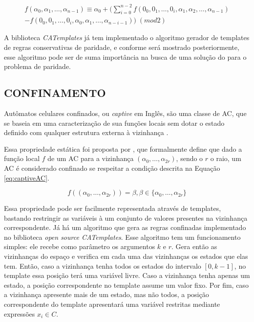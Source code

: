 \documentclass[12pt,a4paper]{article}
\begin{document}
	\begin{equation}
	\begin{split}
	f(\alpha_0,\alpha_1, \dots,\alpha_{n-1}) \equiv \alpha_0 + (\sum_{i=0}^{n-2}f(0_0,0_1, \dots,0_i,\alpha_1,\alpha_2, \dots,\alpha_{n-1}) \\- f(0_0,0_1, \dots,0_i,\alpha_0,\alpha_1, \dots,\alpha_{n-i-1})) \; (mod 2)  
	\label{eq:parityConservativeCA}
	\end{split}
	\end{equation}

	A biblioteca \textit{CATemplates} já tem implementado o algoritmo gerador de templates de regras conservativas de paridade, e conforme será mostrado posteriormente, esse algoritmo pode ser de suma importância na busca de uma solução do para o problema de paridade.





	\subsection{CONFINAMENTO}
	Autômatos celulares confinados, ou \textit{captive} em Inglês, são uma classe de AC, que se baseia em uma caracterização de sua funções locais sem dotar o estado definido com qualquer estrutura externa à vizinhança \cite{theyssier2004captive}. 

	Essa propriedade estática foi proposta por , que formalmente define que dado a função local $f$ de um AC para a vizinhança $(\alpha_0, \dots, \alpha_{2r})$, sendo o $r$ o raio, um AC é considerado confinado se respeitar a condição descrita na Equação \ref{eq:captiveAC}.

	\begin{equation}
	f((\alpha_0, \dots, \alpha_{2r})) = \beta, \beta \in \{\alpha_0, \dots, \alpha_{2r}\}
	\label{eq:captiveAC}
	\end{equation}

	Essa propriedade pode ser facilmente representada através de templates, bastando restringir as variáveis à um conjunto de valores presentes na vizinhança correspondente. Já há um algoritmo que gera as regras confinadas implementado no biblioteca \textit{open source CATemplates}. Esse algoritmo tem um funcionamento simples: ele recebe como parâmetro os argumentos $k$ e $r$. Gera então as vizinhanças do espaço e verifica em cada uma das vizinhanças os estados que elas tem. Então, caso a vizinhança tenha todos os estados do intervalo $[0, k-1]$, no template essa posição terá uma variável livre. Caso a vizinhança tenha apenas um estado, a posição correspondente no template assume um valor fixo. Por fim, caso a vizinhança apresente mais de um estado, mas não todos, a posição correspondente do template apresentará uma variável restritas mediante expressões $x_i \in C$.
\end{document}
